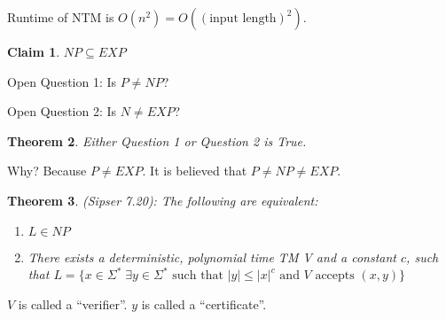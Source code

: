 \documentclass[twoside]{article}
\newcounter{lecnum}
\newtheorem{theorem}{Theorem}[lecnum]
\newtheorem{claim}[theorem]{Claim}
\begin{document}
Runtime of NTM is $O(n^2) = O((\text{input length})^2)$.

\begin{claim}
  $NP \subseteq EXP$
\end{claim}

Open Question 1: Is $P \neq NP$?

Open Question 2: Is $N \neq EXP$?

\begin{theorem}
  Either Question 1 or Question 2 is True.
\end{theorem}

Why? Because $P \neq EXP$. It is believed that $P \neq NP \neq EXP$.

\begin{theorem}
  (Sipser 7.20): The following are equivalent:
  \begin{enumerate}
    \item $L \in NP$
    \item There exists a deterministic, polynomial time TM V and a constant $c$, such that $L = \{x \in \Sigma^* \; \exists y \in \Sigma^* \text{ such that } |y| \leq |x|^c \text{ and } V \text{ accepts } (x, y)\}$
  \end{enumerate}
\end{theorem}

$V$ is called a ``verifier''. $y$ is called a ``certificate''. 
\end{document}
